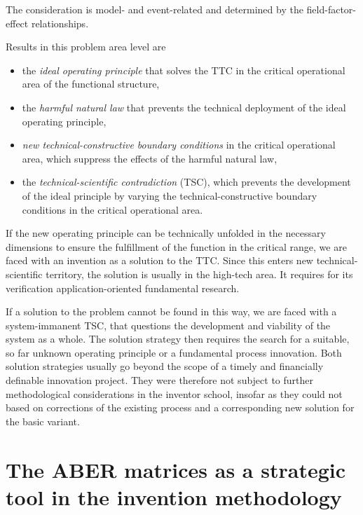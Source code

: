 \documentclass[11pt,a4paper]{article}
\begin{document}
The consideration is model- and event-related and determined by the
field-factor-effect relationships.

Results in this problem area level are
\begin{itemize}
\item the \emph{ideal operating principle} that solves the TTC in the critical
  operational area of the functional structure,
\item the \emph{harmful natural law} that prevents the technical deployment of
  the ideal operating principle,
\item \emph{new technical-constructive boundary conditions} in the critical
  operational area, which suppress the effects of the harmful natural law,
\item the \emph{technical-scientific contradiction} (TSC), which prevents the
  development of the ideal principle by varying the technical-constructive
  boundary conditions in the critical operational area.
\end{itemize}
If the new operating principle can be technically unfolded in the necessary
dimensions to ensure the fulfillment of the function in the critical range, we
are faced with an invention as a solution to the TTC.  Since this enters new
technical-scientific territory, the solution is usually in the high-tech
area. It requires for its verification application-oriented fundamental
research.

If a solution to the problem cannot be found in this way, we are faced with a
system-immanent TSC, that questions the development and viability of the
system as a whole. The solution strategy then requires the search for a
suitable, so far unknown operating principle or a fundamental process
innovation. Both solution strategies usually go beyond the scope of a timely
and financially definable innovation project. They were therefore not subject
to further methodological considerations in the inventor school, insofar as
they could not based on corrections of the existing process and a
corresponding new solution for the basic variant.

\section{The ABER matrices as a strategic tool in the invention methodology}
\end{document}
